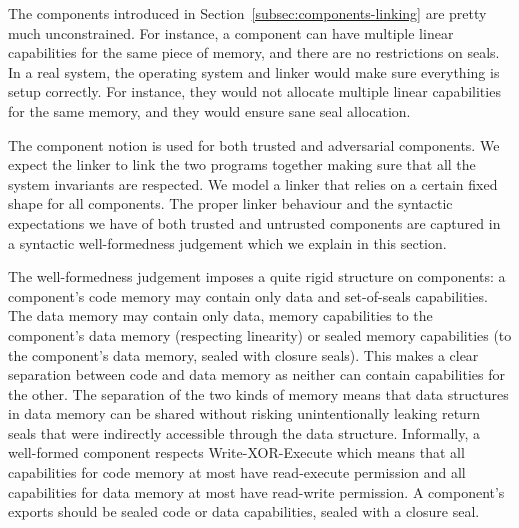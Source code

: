 \documentclass{jfp}
\newenvironment{jversion}{}{}
\begin{document}
\begin{jversion}
  The components introduced in Section~\ref{subsec:components-linking} are pretty much unconstrained.
  For instance, a component can have multiple linear capabilities for the same piece of memory, and there are no restrictions on seals.
  In a real system, the operating system and linker  %
  would make sure everything is setup correctly.
  For instance, they would not allocate multiple linear capabilities for the same memory, and they would ensure sane seal allocation.

  The component notion is used for both trusted and adversarial components.
  We expect the linker to link the two programs together making sure that all the system invariants are respected.
  We model a linker that relies on a certain fixed shape for all components.
  The proper linker behaviour and the syntactic expectations we have of both trusted and untrusted components are captured in a syntactic well-formedness judgement which we explain in this section.

  The well-formedness judgement imposes a quite rigid structure on components: a component's code memory may contain only data and set-of-seals capabilities.
  The data memory may contain only data, memory capabilities to the component's data memory (respecting linearity) or sealed memory capabilities (to the component's data memory, sealed with closure seals).
  This makes a clear separation between code and data memory as neither can contain capabilities for the other.
  The separation of the two kinds of memory means that data structures in data memory can be shared without risking unintentionally leaking return seals that were indirectly accessible through the data structure.
  Informally, a well-formed component respects Write-XOR-Execute which means that all capabilities for code memory at most have read-execute permission and all capabilities for data memory at most have read-write permission.
  A component's exports should be sealed code or data capabilities, sealed with a closure seal.


\end{jversion}
\end{document}
